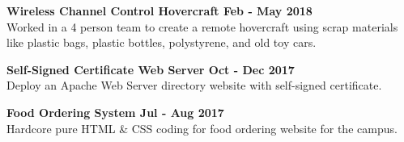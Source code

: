 \textbf{Wireless Channel Control Hovercraft \hfill Feb - May 2018} \\ 
    Worked in a 4 person team to create a remote hovercraft using scrap materials like plastic bags, plastic bottles, polystyrene, and old toy cars. \vspace{0.2cm}

\textbf{Self-Signed Certificate Web Server \hfill Oct - Dec 2017} \\
    Deploy an Apache Web Server directory website with self-signed certificate. \vspace{0.2cm}

\textbf{Food Ordering System \hfill Jul - Aug 2017} \\
    Hardcore pure HTML \& CSS coding for food ordering website for the campus. \vspace{0.2cm}